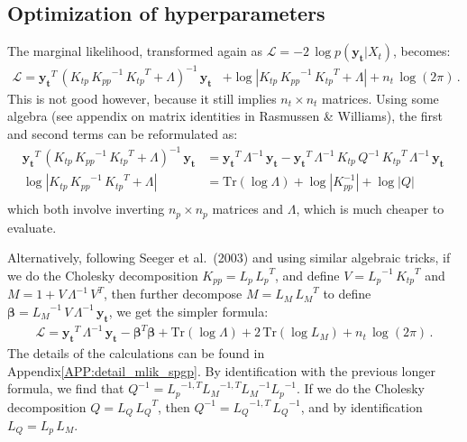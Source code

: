 \documentclass[11pt,a4paper]{article}
\newcommand\rapp[1]{Appendix\;\ref{#1}}
\newcommand{\abs}[1]{\left| #1 \right|}
\newcommand{\tr}{\text{Tr}}
\numberwithin{equation}{section}
\begin{document}
\subsection{Optimization of hyperparameters}

The marginal likelihood, transformed again as $\mathcal{L} = -2\,\log p(\mathbf{y_t} | X_t)$, becomes:
\begin{align}
\mathcal{L} = \mathbf{y_t}^T\,(K_{tp}\,{K_{pp}}^{-1}\,{K_{tp}}^T + \Lambda)^{-1}\,\mathbf{y_t} &+ \log \abs{K_{tp}\,{K_{pp}}^{-1}\,{K_{tp}}^T + \Lambda} + n_t\,\log(2\pi)\,.
\end{align}
This is not good however, because it still implies $n_t \times n_t$ matrices. Using some algebra (see appendix on matrix identities in Rasmussen \& Williams), the first and second terms can be reformulated as:
\begin{align}
\mathbf{y_t}^T\,(K_{tp}\,{K_{pp}}^{-1}\,{K_{tp}}^T + \Lambda)^{-1}\,\mathbf{y_t} &= \mathbf{y_t}^T\,\Lambda^{-1}\,\mathbf{y_t} - \mathbf{y_t}^T\,\Lambda^{-1}\,K_{tp}\,Q^{-1}\,{K_{tp}}^T\,\Lambda^{-1}\,\mathbf{y_t}\, \\
\log \abs{K_{tp}\,{K_{pp}}^{-1}\,{K_{tp}}^T + \Lambda} &= \tr\left(\log \Lambda\right) + \log \abs{K_{pp}^{-1}} + \log \abs{Q} \nonumber \\
\end{align}
which both involve inverting $n_p \times n_p$ matrices and $\Lambda$, which is much cheaper to evaluate.

Alternatively, following Seeger et al.~(2003) and using similar algebraic tricks, if we do the Cholesky decomposition $K_{pp} = L_p\,{L_p}^T$, and define $V = {L_p}^{-1}\,{K_{tp}}^T$ and $M = 1 + V\,\Lambda^{-1}\,V^T$, then further decompose $M = L_M\,{L_M}^{T}$ to define ${\bm \beta} = {L_M}^{-1}\,V\,\Lambda^{-1}\,\mathbf{y_t}$, we get the simpler formula:
\begin{align}
\mathcal{L} = \mathbf{y_t}^T\,\Lambda^{-1}\,\mathbf{y_t} - {\bm \beta}^{T} {\bm \beta} + \tr\left(\log \Lambda\right) + 2\,\tr\left(\log L_M\right) + n_t\,\log(2\pi)\,.
\end{align}
The details of the calculations can be found in \rapp{APP:detail_mlik_spgp}. By identification with the previous longer formula, we find that $Q^{-1} = {L_p}^{-1,T}{L_M}^{-1,T}{L_M}^{-1}{L_p}^{-1}$. If we do the Cholesky decomposition $Q = L_Q\,{L_Q}^T$, then $Q^{-1} = {L_Q}^{-1,T}\,{L_Q}^{-1}$, and by identification $L_Q = L_p\,L_M$.
\end{document}
